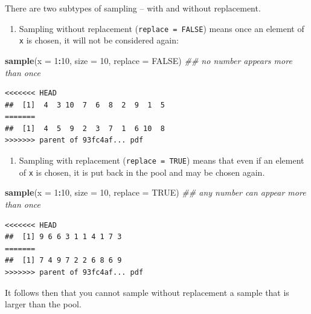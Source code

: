 \documentclass[]{book}
\newenvironment{Shaded}{\begin{snugshade}}{\end{snugshade}}
\newcommand{\CommentTok}[1]{\textcolor[rgb]{0.56,0.35,0.01}{\textit{#1}}}
\newcommand{\DataTypeTok}[1]{\textcolor[rgb]{0.13,0.29,0.53}{#1}}
\newcommand{\DecValTok}[1]{\textcolor[rgb]{0.00,0.00,0.81}{#1}}
\newcommand{\KeywordTok}[1]{\textcolor[rgb]{0.13,0.29,0.53}{\textbf{#1}}}
\newcommand{\NormalTok}[1]{#1}
\newcommand{\OperatorTok}[1]{\textcolor[rgb]{0.81,0.36,0.00}{\textbf{#1}}}
\newcommand{\OtherTok}[1]{\textcolor[rgb]{0.56,0.35,0.01}{#1}}
\providecommand{\tightlist}{%
  \setlength{\itemsep}{0pt}\setlength{\parskip}{0pt}}
\theoremstyle{definition}
\theoremstyle{definition}
\theoremstyle{definition}
\theoremstyle{remark}
\begin{document}
\begin{Shaded}
\begin{Highlighting}[]
\begin{Shaded}
\begin{Highlighting}[]
\begin{Shaded}
\begin{Highlighting}[]
There are two subtypes of sampling -- with and without replacement.

\begin{enumerate}
\def\labelenumi{\arabic{enumi}.}
\tightlist
\item
  Sampling without replacement (\texttt{replace\ =\ FALSE}) means once an element of \texttt{x} is chosen, it will not be considered again:
\end{enumerate}

\begin{Shaded}
\begin{Highlighting}[]
\KeywordTok{sample}\NormalTok{(}\DataTypeTok{x =} \DecValTok{1}\OperatorTok{:}\DecValTok{10}\NormalTok{, }\DataTypeTok{size =} \DecValTok{10}\NormalTok{, }\DataTypeTok{replace =} \OtherTok{FALSE}\NormalTok{) }\CommentTok{## no number appears more than once}
\end{Highlighting}
\end{Shaded}

\begin{verbatim}
<<<<<<< HEAD
##  [1]  4  3 10  7  6  8  2  9  1  5
=======
##  [1]  4  5  9  2  3  7  1  6 10  8
>>>>>>> parent of 93fc4af... pdf
\end{verbatim}

\begin{enumerate}
\def\labelenumi{\arabic{enumi}.}
\setcounter{enumi}{1}
\tightlist
\item
  Sampling with replacement (\texttt{replace\ =\ TRUE}) means that even if an element of \texttt{x} is chosen, it is put back in the pool and may be chosen again.
\end{enumerate}

\begin{Shaded}
\begin{Highlighting}[]
\KeywordTok{sample}\NormalTok{(}\DataTypeTok{x =} \DecValTok{1}\OperatorTok{:}\DecValTok{10}\NormalTok{, }\DataTypeTok{size =} \DecValTok{10}\NormalTok{, }\DataTypeTok{replace =} \OtherTok{TRUE}\NormalTok{) }\CommentTok{## any number can appear more than once}
\end{Highlighting}
\end{Shaded}

\begin{verbatim}
<<<<<<< HEAD
##  [1] 9 6 6 3 1 1 4 1 7 3
=======
##  [1] 7 4 9 7 2 2 6 8 6 9
>>>>>>> parent of 93fc4af... pdf
\end{verbatim}

It follows then that you cannot sample without replacement a sample that is larger than the pool.


\end{Highlighting}
\end{Shaded}
\end{Highlighting}
\end{Shaded}
\end{Highlighting}
\end{Shaded}
\end{document}
